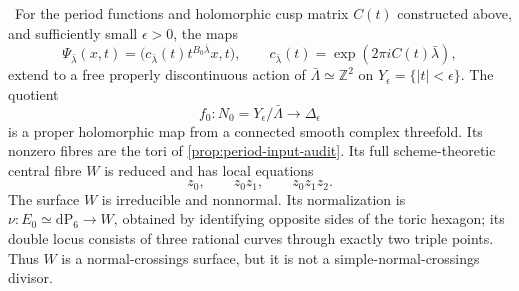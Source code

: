 \begin{theorem}
\label{thm:candidate-cusp-geometry}
\Verified\ For the period functions and holomorphic cusp matrix \(C(t)\)
constructed above, and sufficiently small \(\epsilon>0\), the maps
\[
 \Psi_{\bar\lambda}(x,t)=
 \bigl(c_{\bar\lambda}(t)t^{B_0\bar\lambda}x,t\bigr),
 \qquad
 c_{\bar\lambda}(t)=\exp(2\pi iC(t)\bar\lambda),
\tag{2.5}
\]
extend to a free properly discontinuous action of
\(\bar\Lambda\simeq\mathbb Z^2\) on
\(Y_\epsilon=\{|t|<\epsilon\}\).  The quotient
\[
 f_0:N_0=Y_\epsilon/\bar\Lambda\longrightarrow\Delta_\epsilon
\]
is a proper holomorphic map from a connected smooth complex threefold.
Its nonzero fibres are the tori of \cref{prop:period-input-audit}.  Its full
scheme-theoretic central fibre \(W\) is reduced and has local equations
\[
 z_0,\qquad z_0z_1,\qquad z_0z_1z_2.
\tag{2.6}
\]
The surface \(W\) is irreducible and nonnormal.  Its normalization is
\(\nu:E_0\simeq\mathrm{dP}_6\to W\), obtained by identifying opposite sides
of the toric hexagon; its double locus consists of three rational curves
through exactly two triple points.  Thus \(W\) is a normal-crossings surface,
but it is not a simple-normal-crossings divisor.
\end{theorem}

